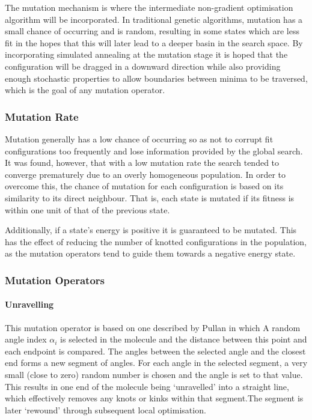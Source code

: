 \documentclass{article}
\begin{document}
The mutation mechanism is where the intermediate non-gradient optimisation
algorithm will be incorporated. In traditional genetic algorithms, mutation has
a small chance of occurring and is random, resulting in some states which are
less fit in the hopes that this will later lead to a deeper basin in the search
space. By incorporating simulated annealing at the mutation stage it is hoped
that the configuration will be dragged in a downward direction while also
providing enough stochastic properties to allow boundaries between minima to be
traversed, which is the goal of any mutation operator.

\subsubsection{Mutation Rate}

Mutation generally has a low chance of occurring so as not to corrupt fit
configurations too frequently and lose information provided by the global
search. It was found, however, that with a low mutation rate the search tended
to converge prematurely due to an overly homogeneous population. In order to
overcome this, the chance of mutation for each configuration is based on its
similarity to its direct neighbour. That is, each state is mutated if its
fitness is within one unit of that of the previous state.

Additionally, if a state's energy is positive it is guaranteed to be mutated.
This has the effect of reducing the number of knotted configurations in the
population, as the mutation operators tend to guide them towards a negative
energy state.

\subsubsection{Mutation Operators}

\paragraph{Unravelling}

This mutation operator is based on one described by Pullan \cite{PULLAN1998331}
in which A random angle index $\alpha_i$ is selected in the molecule and the
distance between this point and each endpoint is compared. The angles between
the selected angle and the closest end forms a new segment of angles. For each
angle in the selected segment, a very small (close to zero) random number is
chosen and the angle is set to that value. This results in one end of the
molecule being `unravelled' into a straight line, which effectively removes any
knots or kinks within that segment.The segment is later `rewound' through
subsequent local optimisation.
\end{document}
